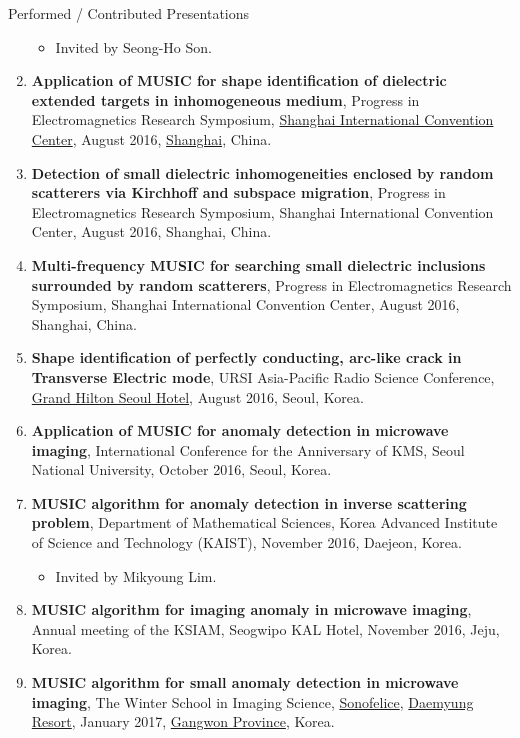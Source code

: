 \documentclass{resume} %
\begin{document}
\begin{rSection}{Performed / Contributed Presentations}
\begin{enumerate}
\begin{itemize}
\item Invited by Seong-Ho Son.
\end{itemize}
\item\label{P-PIERS2016A} \textbf{Application of MUSIC for shape identification of dielectric extended targets in inhomogeneous medium}, Progress in Electromagnetics Research Symposium, \href{http://www.shicc.net/shicc/}{Shanghai International Convention Center}, August 2016, \href{http://www.shanghai.gov.cn/shanghai/node27118/index.html}{Shanghai}, China.
\item\label{P-PIERS2016B} \textbf{Detection of small dielectric inhomogeneities enclosed by random scatterers via Kirchhoff and subspace migration}, Progress in Electromagnetics Research Symposium, Shanghai International Convention Center, August 2016, Shanghai, China.
\item\label{P-PIERS2016C} \textbf{Multi-frequency MUSIC for searching small dielectric inclusions surrounded by random scatterers}, Progress in Electromagnetics Research Symposium, Shanghai International Convention Center, August 2016, Shanghai, China.
\item\label{P-URSI2016} \textbf{Shape identification of perfectly conducting, arc-like crack in Transverse Electric mode}, URSI Asia-Pacific Radio Science Conference, \href{http://www3.hilton.com/en/hotels/south-korea/grand-hilton-seoul-SELGRHI/index.html}{Grand Hilton Seoul Hotel}, August 2016, Seoul, Korea.
\item\label{P-KMS2016} \textbf{Application of MUSIC for anomaly detection in microwave imaging}, International Conference for the  Anniversary of KMS, Seoul National University, October 2016, Seoul, Korea.
\item\label{P-KAIST2016} \textbf{MUSIC algorithm for anomaly detection in inverse scattering problem}, Department of Mathematical Sciences, Korea Advanced Institute of Science and Technology (KAIST), November 2016, Daejeon, Korea.
\begin{itemize}
\item Invited by Mikyoung Lim.
\end{itemize}
\item\label{P-KSIAM2016C} \textbf{MUSIC algorithm for imaging anomaly in microwave imaging}, Annual meeting of the KSIAM, Seogwipo KAL Hotel, November 2016, Jeju, Korea.
\item\label{P-WSIS2017} \textbf{MUSIC algorithm for small anomaly detection in microwave imaging}, The  Winter School in Imaging Science, \href{https://www.daemyungresort.com/sn/}{Sonofelice}, \href{https://www.daemyungresort.com}{Daemyung Resort}, January 2017, \href{https://www.provin.gangwon.kr/gw/eng}{Gangwon Province}, Korea.

\end{enumerate}
\end{rSection}
\end{document}
